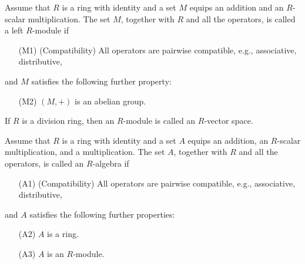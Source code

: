 \begin{defi}[$R$-module]
    Assume that $R$ is a ring with identity and a set $M$ equips an addition and an $R$-scalar multiplication.
    The set $M$, together with $R$ and all the operators, is called a left $R$-module if
    \begin{enumerate}
        \item[(M1)]
        {
            (Compatibility)
            All operators are pairwise compatible, e.g., associative, distributive,
        }
    \end{enumerate}
    and $M$ satisfies the following further property:
    \begin{enumerate}
        \item[(M2)]
        {
            $(M, +)$ is an abelian group.
        }
    \end{enumerate}
\end{defi}
\begin{rmk}
    If $R$ is a division ring, then an $R$-module is called an $R$-vector space.
\end{rmk}

\begin{defi}[$R$-algebra]
    Assume that $R$ is a ring with identity and a set $A$ equips an addition, an $R$-scalar multiplication, and a multiplication.
    The set $A$, together with $R$ and all the operators, is called an $R$-algebra if
    \begin{enumerate}
        \item[(A1)]
        {
            (Compatibility)
            All operators are pairwise compatible, e.g., associative, distributive,
        }
    \end{enumerate}
    and $A$ satisfies the following further properties:
    \begin{enumerate}
        \item[(A2)]
        {
            $A$ is a ring.
        }
        \item[(A3)]
        {
            $A$ is an $R$-module.
        }
    \end{enumerate}
\end{defi}
